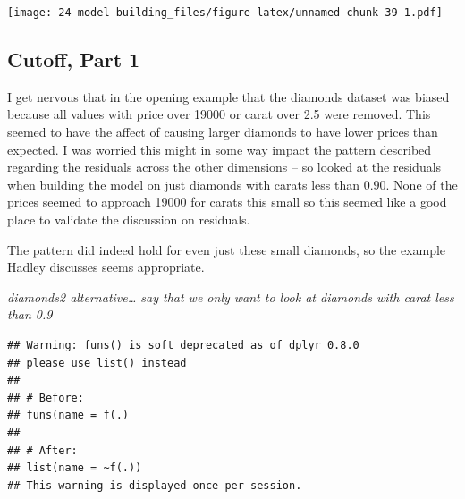 \documentclass[]{book}
\newenvironment{Shaded}{\begin{snugshade}}{\end{snugshade}}
\newcommand{\DataTypeTok}[1]{\textcolor[rgb]{0.13,0.29,0.53}{#1}}
\newcommand{\FloatTok}[1]{\textcolor[rgb]{0.00,0.00,0.81}{#1}}
\newcommand{\KeywordTok}[1]{\textcolor[rgb]{0.13,0.29,0.53}{\textbf{#1}}}
\newcommand{\NormalTok}[1]{#1}
\newcommand{\OperatorTok}[1]{\textcolor[rgb]{0.81,0.36,0.00}{\textbf{#1}}}
\newcommand{\StringTok}[1]{\textcolor[rgb]{0.31,0.60,0.02}{#1}}
\theoremstyle{definition}
\theoremstyle{definition}
\theoremstyle{definition}
\theoremstyle{remark}
\begin{document}
\texttt{[image: 24-model-building\_files/figure-latex/unnamed-chunk-39-1.pdf]}

\hypertarget{cutoff-part-1}{%
\subsection{Cutoff, Part 1}\label{cutoff-part-1}}

I get nervous that in the opening example that the diamonds dataset was
biased because all values with price over 19000 or carat over 2.5 were
removed. This seemed to have the affect of causing larger diamonds to
have lower prices than expected. I was worried this might in some way
impact the pattern described regarding the residuals across the other
dimensions -- so looked at the residuals when building the model on just
diamonds with carats less than 0.90. None of the prices seemed to
approach 19000 for carats this small so this seemed like a good place to
validate the discussion on residuals.

The pattern did indeed hold for even just these small diamonds, so the
example Hadley discusses seems appropriate.

\emph{diamonds2 alternative\ldots{} say that we only want to look at
diamonds with carat less than 0.9}

\begin{Shaded}
\end{Shaded}

\begin{verbatim}
## Warning: funs() is soft deprecated as of dplyr 0.8.0
## please use list() instead
## 
## # Before:
## funs(name = f(.)
## 
## # After: 
## list(name = ~f(.))
## This warning is displayed once per session.
\end{verbatim}

\begin{Shaded}
\end{Shaded}
\end{document}
